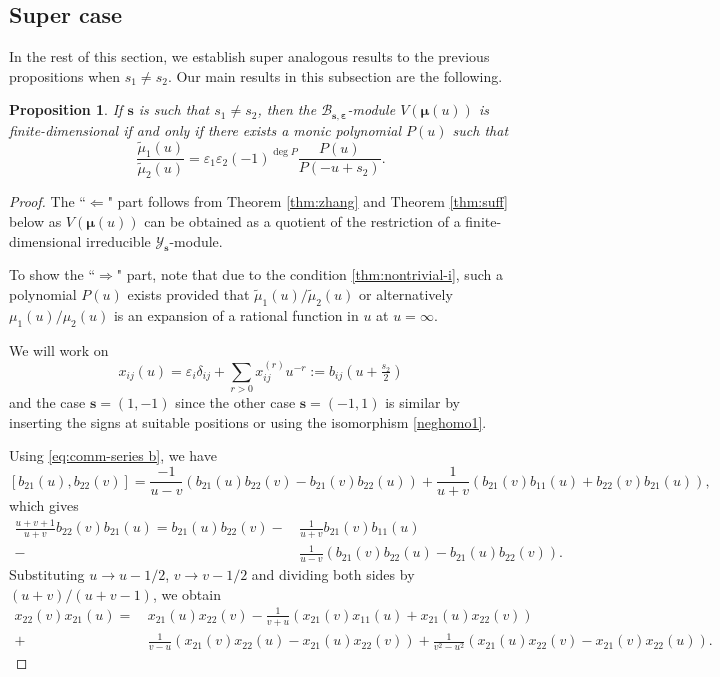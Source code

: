 \documentclass[11pt,reqno]{amsart}
\numberwithin{equation}{section}
\newtheorem{prop}[thm]{Proposition}
\theoremstyle{definition}
\theoremstyle{remark}
\newcommand{\beq}{\begin{equation}}
\newcommand{\eeq}{\end{equation}}
\newcommand{\tl}{\tilde}
\newcommand{\YMN}{{\mathscr{Y}_{\bm s}}}
\newcommand{\BMN}{{\mathscr{B}_{\bm s,\bm \ve}}}
\newcommand{\ve}{\varepsilon}
\begin{document}
\subsection{Super case}
In the rest of this section, we establish super analogous results to the previous propositions when $s_1\ne s_2$. Our main results in this subsection are the following.
\begin{prop}\label{prop:rank1}
If $\bm s$ is such that $s_1\ne s_2$, then the $\BMN$-module $V(\bm\mu(u))$ is finite-dimensional if and only if there exists a monic polynomial $P(u)$ such that
\[
\frac{\tl \mu_1(u)}{\tl \mu_2(u)}=\ve_1\ve_2(-1)^{\deg P}\frac{P(u)}{P(-u+s_2)}.
\]
\end{prop}
\begin{proof}
The ``$\Longleftarrow$" part follows from Theorem \ref{thm:zhang} and Theorem \ref{thm:suff} below as $V(\bm\mu(u))$ can be obtained as a quotient of the restriction of a finite-dimensional irreducible $\YMN$-module.

To show the ``$\Longrightarrow$" part, note that due to the condition \eqref{thm:nontrivial-i}, such a polynomial $P(u)$ exists provided that ${\tl \mu_1(u)}/{\tl \mu_2(u)}$ or alternatively $\mu_1(u)/\mu_2(u)$ is an expansion of a rational function in $u$ at $u=\infty$.

We will work on
$$
x_{ij}(u)=\ve_i\delta_{ij}+\sum_{r>0}x_{ij}^{(r)}u^{-r}:=b_{ij}(u+\tfrac{s_2}{2})
$$
and the case $\bm s=(1,-1)$ since the other case $\bm s=(-1,1)$ is similar by inserting the signs at suitable positions or using the isomorphism \eqref{neghomo1}.

Using \eqref{eq:comm-series b}, we have
\[
[b_{21}(u),b_{22}(v)]=\frac{-1}{u-v}(b_{21}(u)b_{22}(v)-b_{21}(v)b_{22}(u))+\frac{1}{u+v}(b_{21}(v)b_{11}(u)+b_{22}(v)b_{21}(u)),
\]
which gives
\begin{align*}
\frac{u+v+1}{u+v}b_{22}(v)b_{21}(u)=b_{21}(u)b_{22}(v)-&\,\frac{1}{u+v}b_{21}(v)b_{11}(u)\\-&\,\frac{1}{u-v}(b_{21}(v)b_{22}(u)-b_{21}(u)b_{22}(v)).
\end{align*}
Substituting $u\to u-1/2$, $v\to v-1/2$ and dividing both sides by $(u+v)/(u+v-1)$, we obtain
\beq\label{eq:new-b}
\begin{split}
x_{22}(v)x_{21}(u)=&\, x_{21}(u)x_{22}(v)-\frac{1}{v+u}(x_{21}(v)x_{11}(u)+x_{21}(u)x_{22}(v))\\
+&\, \frac{1}{v-u}(x_{21}(v)x_{22}(u)-x_{21}(u)x_{22}(v))+\frac{1}{v^2-u^2}(x_{21}(u)x_{22}(v)-x_{21}(v)x_{22}(u)).
\end{split}
\eeq



\end{proof}
\end{document}
